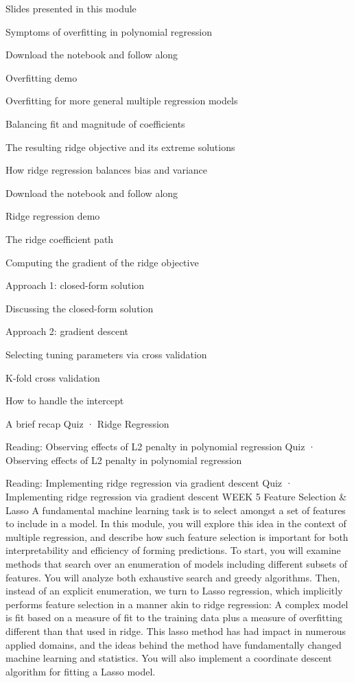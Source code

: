 \item Slides presented in this module
\item Symptoms of overfitting in polynomial regression
\item Download the notebook and follow along
\item Overfitting demo
\item Overfitting for more general multiple regression models
\item Balancing fit and magnitude of coefficients
\item The resulting ridge objective and its extreme solutions
\item How ridge regression balances bias and variance
\item Download the notebook and follow along
\item Ridge regression demo
\item The ridge coefficient path
\item Computing the gradient of the ridge objective
\item Approach 1: closed-form solution
\item Discussing the closed-form solution
\item Approach 2: gradient descent
\item Selecting tuning parameters via cross validation
\item K-fold cross validation
\item How to handle the intercept
\item A brief recap
Quiz · Ridge Regression
\item Reading: Observing effects of L2 penalty in polynomial regression
Quiz · Observing effects of L2 penalty in polynomial regression
\item Reading: Implementing ridge regression via gradient descent
Quiz · Implementing ridge regression via gradient descent
WEEK 5
Feature Selection & Lasso
A fundamental machine learning task is to select amongst a set of features to include in a model. In this module, you will explore this idea in the context of multiple regression, and describe how such feature selection is important for both interpretability and efficiency of forming predictions.
To start, you will examine methods that search over an enumeration of models including different subsets of features. You will analyze both exhaustive search and greedy algorithms. Then, instead of an explicit enumeration, we turn to Lasso regression, which implicitly performs feature selection in a manner akin to ridge regression: A complex model is fit based on a measure of fit to the training data plus a measure of overfitting different than that used in ridge. This lasso method has had impact in numerous applied domains, and the ideas behind the method have fundamentally changed machine learning and statistics. You will also implement a coordinate descent algorithm for fitting a Lasso model.

